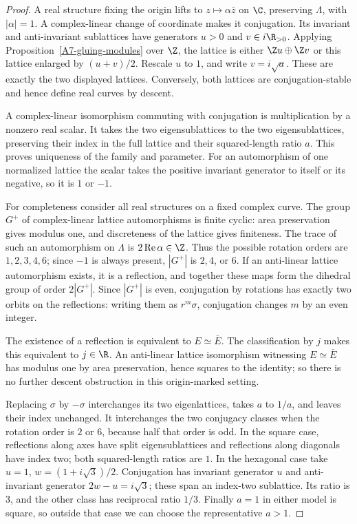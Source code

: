 \begin{proof}
A real structure fixing the origin lifts to $z\mapsto\alpha\bar{z}$ on $\C$, preserving $\Lambda$, with $|\alpha|=1$. A complex-linear change of coordinate makes it conjugation. Its invariant and anti-invariant sublattices have generators $u>0$ and $v\in i\R_{>0}$. Applying Proposition~\ref{A7-gluing-modules} over $\Z$, the lattice is either $\Z u\oplus\Z v$ or this lattice enlarged by $(u+v)/2$. Rescale $u$ to $1$, and write $v=i\sqrt a$. These are exactly the two displayed lattices. Conversely, both lattices are conjugation-stable and hence define real curves by descent.

A complex-linear isomorphism commuting with conjugation is multiplication by a nonzero real scalar. It takes the two eigensublattices to the two eigensublattices, preserving their index in the full lattice and their squared-length ratio $a$. This proves uniqueness of the family and parameter. For an automorphism of one normalized lattice the scalar takes the positive invariant generator to itself or its negative, so it is $1$ or $-1$.

For completeness consider all real structures on a fixed complex curve. The group $G^+$ of complex-linear lattice automorphisms is finite cyclic: area preservation gives modulus one, and discreteness of the lattice gives finiteness. The trace of such an automorphism on $\Lambda$ is $2\operatorname{Re}\alpha\in\Z$. Thus the possible rotation orders are $1,2,3,4,6$; since $-1$ is always present, $|G^+|$ is $2,4$, or $6$. If an anti-linear lattice automorphism exists, it is a reflection, and together these maps form the dihedral group of order $2|G^+|$. Since $|G^+|$ is even, conjugation by rotations has exactly two orbits on the reflections: writing them as $r^m\sigma$, conjugation changes $m$ by an even integer.

The existence of a reflection is equivalent to $E\simeq\overline{E}$. The classification by $j$ \cite[II, Proposition 2.1(c)]{MilneEC2021A567} makes this equivalent to $j\in\R$. An anti-linear lattice isomorphism witnessing $E\simeq\overline{E}$ has modulus one by area preservation, hence squares to the identity; so there is no further descent obstruction in this origin-marked setting.

Replacing $\sigma$ by $-\sigma$ interchanges its two eigenlattices, takes $a$ to $1/a$, and leaves their index unchanged. It interchanges the two conjugacy classes when the rotation order is $2$ or $6$, because half that order is odd. In the square case, reflections along axes have split eigensublattices and reflections along diagonals have index two; both squared-length ratios are $1$. In the hexagonal case take $u=1$, $w=(1+i\sqrt3)/2$. Conjugation has invariant generator $u$ and anti-invariant generator $2w-u=i\sqrt3$; these span an index-two sublattice. Its ratio is $3$, and the other class has reciprocal ratio $1/3$. Finally $a=1$ in either model is square, so outside that case we can choose the representative $a>1$.
\end{proof}

